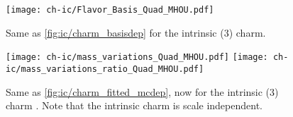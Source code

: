 \begin{figure}
  \centering
  \texttt{[image: ch-ic/Flavor\_Basis\_Quad\_MHOU.pdf]}
  \caption{\small
    Same as \cref{fig:ic/charm_basisdep} for the intrinsic (3\fns) charm.
  }
  \label{fig:ic/charm_basisdep_3FNS} 
\end{figure}

\begin{figure}
  \centering
  \texttt{[image: ch-ic/mass\_variations\_Quad\_MHOU.pdf]}
  \texttt{[image: ch-ic/mass\_variations\_ratio\_Quad\_MHOU.pdf]}
  \caption{\small      
    Same as \cref{fig:ic/charm_fitted_mcdep}, now for the intrinsic (3\fns)
    charm \pdf. Note that the intrinsic charm \pdf is scale independent. 
  }
  \label{fig:ic/mass_variations_Quad_MHOU}
\end{figure}

